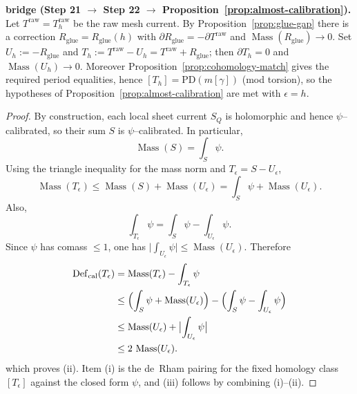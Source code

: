 \documentclass[11pt]{article}
\numberwithin{equation}{section}  %
\theoremstyle{plain}
\theoremstyle{definition}
\theoremstyle{remark}
\DeclareMathOperator{\Mass}{Mass}
\newcommand{\Def}{\mathrm{Def}}
\begin{document}
\noindent\textbf{bridge (Step 21 $\rightarrow$ Step 22 $\rightarrow$ Proposition~\ref{prop:almost-calibration}).}
Let $T^{\mathrm{raw}}=T^{\mathrm{raw}}_h$ be the raw mesh current.
By Proposition~\ref{prop:glue-gap} there is a correction $R_{\mathrm{glue}}=R_{\mathrm{glue}}(h)$ with
$\partial R_{\mathrm{glue}}=-\partial T^{\mathrm{raw}}$ and $\Mass(R_{\mathrm{glue}})\to 0$.
Set $U_h:=-R_{\mathrm{glue}}$ and $T_h:=T^{\mathrm{raw}}-U_h=T^{\mathrm{raw}}+R_{\mathrm{glue}}$; then $\partial T_h=0$ and $\Mass(U_h)\to 0$.
Moreover Proposition~\ref{prop:cohomology-match} gives the required period equalities, hence $[T_h]=\mathrm{PD}(m[\gamma])$
(mod torsion), so the hypotheses of Proposition~\ref{prop:almost-calibration} are met with $\epsilon=h$.







\begin{proof}
By construction, each local sheet current $S_Q$ is holomorphic and hence $\psi$--calibrated, so their sum $S$ is $\psi$--calibrated.
In particular,
\[
\Mass(S)=\int_S\psi.
\]
Using the triangle inequality for the mass norm and $T_\epsilon=S-U_\epsilon$,
\[
\Mass(T_\epsilon)\le \Mass(S)+\Mass(U_\epsilon)=\int_S\psi+\Mass(U_\epsilon).
\]
Also,
\[
\int_{T_\epsilon}\psi=\int_S\psi-\int_{U_\epsilon}\psi.
\]
Since $\psi$ has comass $\le 1$, one has $\bigl|\int_{U_\epsilon}\psi\bigr|\le \Mass(U_\epsilon)$.
Therefore
\[
\begin{aligned}
\Def_{\mathrm{cal}}(T_\epsilon)
&= \Mass(T_\epsilon)-\int_{T_\epsilon}\psi \\
&\le \Bigl(\int_S\psi+\Mass(U_\epsilon)\Bigr)
     -\Bigl(\int_S\psi-\int_{U_\epsilon}\psi\Bigr) \\
&\le \Mass(U_\epsilon)+\bigl|\int_{U_\epsilon}\psi\bigr| \\
&\le 2\,\Mass(U_\epsilon).
\end{aligned}
\]
which proves (ii).
Item (i) is the de~Rham pairing for the fixed homology class $[T_\epsilon]$ against the closed form $\psi$,
and (iii) follows by combining (i)--(ii).
\end{proof}
\end{document}
